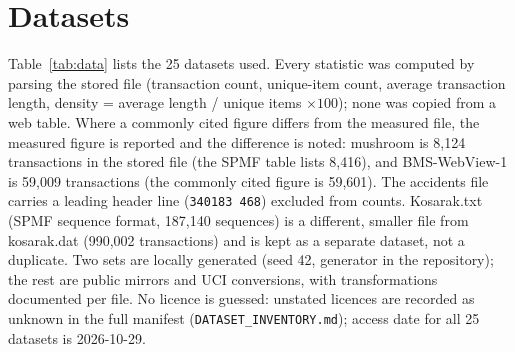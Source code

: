 \documentclass[journal,a4paper]{IEEEtran}
\begin{document}
\section{Datasets}
\label{sec:data}
Table~\ref{tab:data} lists the 25 datasets used. Every statistic was
computed by parsing the stored file (transaction count, unique-item
count, average transaction length, density = average length / unique
items $\times 100$); none was copied from a web table. Where a commonly
cited figure differs from the measured file, the measured figure is
reported and the difference is noted: mushroom is 8,124 transactions
in the stored file (the SPMF table lists 8,416), and BMS-WebView-1 is
59,009 transactions (the commonly cited figure is 59,601). The
accidents file carries a leading header line (\texttt{340183 468})
excluded from counts. Kosarak.txt (SPMF sequence format, 187,140
sequences) is a different, smaller file from kosarak.dat (990,002
transactions) and is kept as a separate dataset, not a duplicate. Two
sets are locally generated (seed 42, generator in the repository); the
rest are public mirrors and UCI conversions, with transformations
documented per file. No licence is guessed: unstated licences are recorded as unknown in
the full manifest (\texttt{DATASET\_INVENTORY.md}); access date for all
25 datasets is 2026-10-29.
\end{document}
